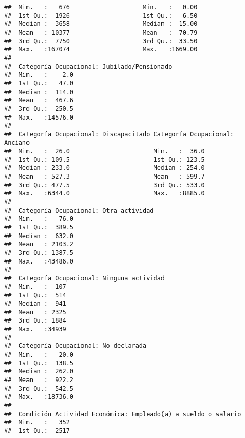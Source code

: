 \documentclass[11pt,]{article}
\begin{document}
\begin{verbatim}
##  Min.   :   676                    Min.   :   0.00                
##  1st Qu.:  1926                    1st Qu.:   6.50                
##  Median :  3658                    Median :  15.00                
##  Mean   : 10377                    Mean   :  70.79                
##  3rd Qu.:  7750                    3rd Qu.:  33.50                
##  Max.   :167074                    Max.   :1669.00                
##                                                                   
##  Categoría Ocupacional: Jubilado/Pensionado
##  Min.   :    2.0                           
##  1st Qu.:   47.0                           
##  Median :  114.0                           
##  Mean   :  467.6                           
##  3rd Qu.:  250.5                           
##  Max.   :14576.0                           
##                                            
##  Categoría Ocupacional: Discapacitado Categoría Ocupacional: Anciano
##  Min.   :  26.0                       Min.   :  36.0                
##  1st Qu.: 109.5                       1st Qu.: 123.5                
##  Median : 233.0                       Median : 254.0                
##  Mean   : 527.3                       Mean   : 599.7                
##  3rd Qu.: 477.5                       3rd Qu.: 533.0                
##  Max.   :6344.0                       Max.   :8885.0                
##                                                                     
##  Categoría Ocupacional: Otra actividad
##  Min.   :   76.0                      
##  1st Qu.:  389.5                      
##  Median :  632.0                      
##  Mean   : 2103.2                      
##  3rd Qu.: 1387.5                      
##  Max.   :43486.0                      
##                                       
##  Categoría Ocupacional: Ninguna actividad
##  Min.   :  107                           
##  1st Qu.:  514                           
##  Median :  941                           
##  Mean   : 2325                           
##  3rd Qu.: 1884                           
##  Max.   :34939                           
##                                          
##  Categoría Ocupacional: No declarada
##  Min.   :   20.0                    
##  1st Qu.:  138.5                    
##  Median :  262.0                    
##  Mean   :  922.2                    
##  3rd Qu.:  542.5                    
##  Max.   :18736.0                    
##                                     
##  Condición Actividad Económica: Empleado(a) a sueldo o salario
##  Min.   :   352                                               
##  1st Qu.:  2517                                               

\end{verbatim}
\end{document}
